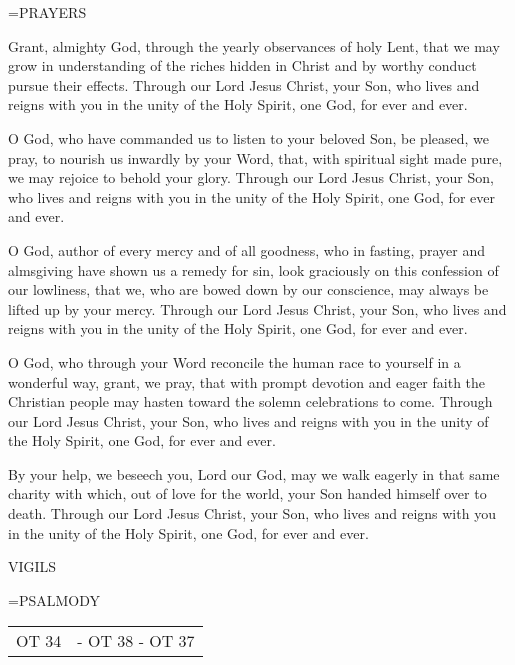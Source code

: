 \hangindent=\parindent \small PRAYERS
\begin{description}[labelindent=\parindent, noitemsep, leftmargin=*]
\item [Week 1:] 	Grant, almighty God, through the yearly observances of holy Lent, that we may grow in understanding of the riches hidden in Christ and by worthy conduct pursue their effects. Through our Lord Jesus Christ, your Son, who lives and reigns with you in the unity of the Holy Spirit, one God, for ever and ever.
\item [Week 2:] 	O God, who have commanded us to listen to your beloved Son, be pleased, we pray, to nourish us inwardly by your Word, that, with spiritual sight made pure, we may rejoice to behold your glory. Through our Lord Jesus Christ, your Son, who lives and reigns with you in the unity of the Holy Spirit, one God, for ever and ever.
\item [Week 3:] 	O God, author of every mercy and of all goodness, who in fasting, prayer and almsgiving have shown us a remedy for sin, look graciously on this confession of our lowliness, that we, who are bowed down by our conscience, may always be lifted up by your mercy. Through our Lord Jesus Christ, your Son, who lives and reigns with you in the unity of the Holy Spirit, one God, for ever and ever.
\item [Week 4:] 	O God, who through your Word reconcile the human race to yourself in a wonderful way, grant, we pray, that with prompt devotion and eager faith the Christian people may hasten toward the solemn celebrations to come. Through our Lord Jesus Christ, your Son, who lives and reigns with you in the unity of the Holy Spirit, one God, for ever and ever.
\item [Week 5:] 	By your help, we beseech you, Lord our God, may we walk eagerly in that same charity with which, out of love for the world, your Son handed himself over to death. Through our Lord Jesus Christ, your Son, who lives and reigns with you in the unity of the Holy Spirit, one God, for ever and ever.
\end{description}

\begin{flushleft}\normalsize VIGILS\\\end{flushleft}
\hangindent=\parindent \small{PSALMODY}
\begin{center}
\begin{tabular}{ l l }
OT 34 &  - OT 38 - OT 37\\
\end{tabular}
\end{center}		

